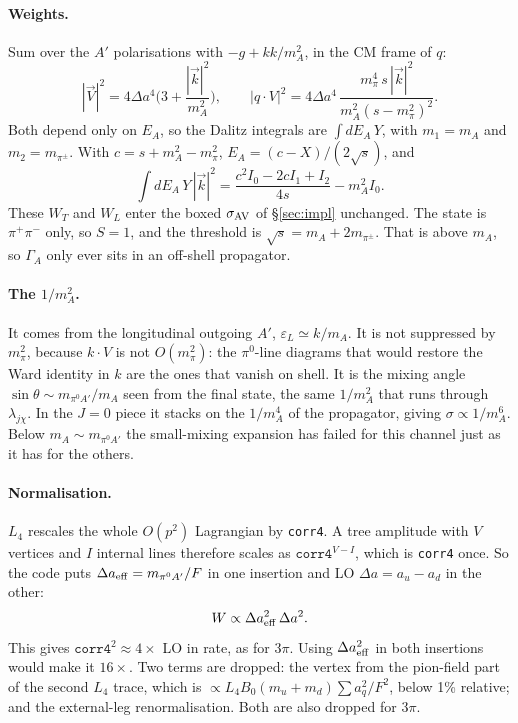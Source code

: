 \documentclass{article}
\newcommand{\mpi}{m_\pi}
\newcommand{\Da}{\Delta a}
\begin{document}
\paragraph{Weights.} Sum over the $A'$ polarisations with $-g+kk/m_A^2$, in the CM frame of $q$:
\begin{equation}
  |\vec V|^2=4\Da^4\Big(3+\frac{|\vec k|^2}{m_A^2}\Big),\qquad
  |q\cdot V|^2=4\Da^4\,\frac{\mpi^4\,s\,|\vec k|^2}{m_A^2(s-\mpi^2)^2}.
\end{equation}
Both depend only on $E_A$, so the Dalitz integrals are $\int dE_A\,Y$, with $m_1=m_A$ and
$m_2=m_{\pi^\pm}$. With $c=s+m_A^2-\mpi^2$, $E_A=(c-X)/(2\sqrt s)$, and
\begin{equation}
  \int\!dE_A\,Y\,|\vec k|^2=\frac{c^2I_0-2cI_1+I_2}{4s}-m_A^2I_0 .
\end{equation}
These $W_T$ and $W_L$ enter the boxed $\sigma_{\rm AV}$ of \S\ref{sec:impl} unchanged. The state is
$\pi^+\pi^-$ only, so $S=1$, and the threshold is $\sqrt s=m_A+2m_{\pi^\pm}$. That is above $m_A$,
so $\Gamma_A$ only ever sits in an off-shell propagator.

\paragraph{The $1/m_A^2$.} It comes from the longitudinal outgoing $A'$, $\varepsilon_L\simeq k/m_A$.
It is not suppressed by $\mpi^2$, because $k\cdot V$ is not $O(\mpi^2)$: the $\pi^0$-line diagrams
that would restore the Ward identity in $k$ are the ones that vanish on shell. It is the mixing
angle $\sin\theta\sim m_{\pi^0A'}/m_A$ seen from the final state, the same $1/m_A^2$ that runs
through $\lambda_{j\chi}$. In the $J=0$ piece it stacks on the $1/m_A^4$ of the propagator, giving
$\sigma\propto1/m_A^6$. Below $m_A\sim m_{\pi^0A'}$ the small-mixing expansion has failed for this
channel just as it has for the others.

\paragraph{Normalisation.} $L_4$ rescales the whole $O(p^2)$ Lagrangian by \texttt{corr4}. A tree
amplitude with $V$ vertices and $I$ internal lines therefore scales as $\texttt{corr4}^{V-I}$,
which is \texttt{corr4} once. So the code puts $\Da_{\rm eff}=m_{\pi^0A'}/F$ in one insertion and
LO $\Da=a_u-a_d$ in the other:
\begin{equation}
  W\propto\Da_{\rm eff}^2\,\Da^2 .
\end{equation}
This gives $\texttt{corr4}^2\approx4\times$ LO in rate, as for $3\pi$. Using $\Da_{\rm eff}^2$
in both insertions would make it $16\times$. Two terms are dropped: the vertex from the
pion-field part of the second $L_4$ trace, which is $\propto L_4B_0(m_u+m_d)\sum a_q^2/F^2$, below 1\%
relative; and the external-leg renormalisation. Both are also dropped for $3\pi$.
\end{document}
